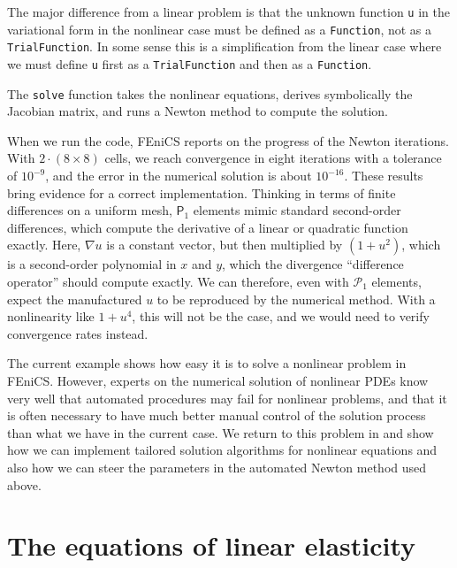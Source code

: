 \documentclass[graybox,envcountchap,sectrefs,final]{svmonodo}
\begin{document}

The major difference from a linear problem is that the unknown function
\texttt{u} in the variational form in the nonlinear case
must be defined as a \texttt{Function}, not as a \texttt{TrialFunction}. In some sense
this is a simplification from the linear case where we must define \texttt{u}
first as a \texttt{TrialFunction} and then as a \texttt{Function}.


The \texttt{solve} function takes the nonlinear equations, derives symbolically
the Jacobian matrix, and runs a Newton method to compute the solution.


When we run the code, FEniCS reports on the progress of the Newton
iterations. With $2\cdot(8\times 8)$ cells, we reach convergence in eight
iterations with a tolerance of $10^{-9}$, and the error in the
numerical solution is about $10^{-16}$. These results bring evidence
for a correct implementation. Thinking in terms of finite differences
on a uniform mesh, $\mathsf{P}_1$ elements mimic standard
second-order differences, which compute the derivative of a linear or
quadratic function exactly. Here, $\nabla u$ is a constant vector, but
then multiplied by $(1+u^2)$, which is a second-order polynomial in
$x$ and $y$, which the divergence ``difference operator'' should
compute exactly. We can therefore, even with $\mathcal{P}_1$
elements, expect the manufactured $u$ to be reproduced by the
numerical method. With a nonlinearity like $1+u^4$, this will not be
the case, and we would need to verify convergence rates instead.

The current example shows how easy it is to solve a nonlinear problem
in FEniCS. However, experts on the numerical solution of nonlinear
PDEs know very well that automated procedures may fail for nonlinear
problems, and that it is often necessary to have much better manual
control of the solution process than what we have in the current
case. We return to this problem in \cite{ftut2} and show how we can
implement tailored solution algorithms for nonlinear equations and also
how we can steer the parameters in the automated Newton method used
above.


\section{The equations of linear elasticity}
\label{ftut:elast}
\end{document}
